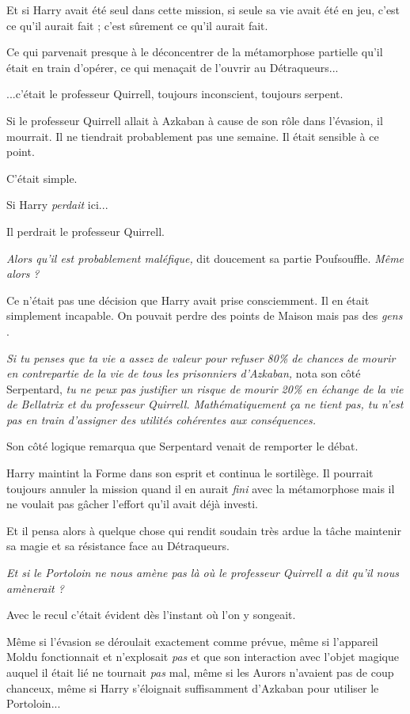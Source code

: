 Et si Harry avait été seul dans cette mission, si seule sa vie avait été en jeu, c'est ce qu'il aurait fait ; c'est sûrement ce qu'il aurait fait.

Ce qui parvenait presque à le déconcentrer de la métamorphose partielle qu'il était en train d'opérer, ce qui menaçait de l'ouvrir au Détraqueurs...

...c'était le professeur Quirrell, toujours inconscient, toujours serpent.

Si le professeur Quirrell allait à Azkaban à cause de son rôle dans l'évasion, il mourrait. Il ne tiendrait probablement pas une semaine. Il était sensible à ce point.

C'était simple.

Si Harry \emph{perdait } ici...

Il perdrait le professeur Quirrell.

\emph{Alors qu'il est probablement maléfique,}  dit doucement sa partie Poufsouffle. \emph{Même alors}  \emph{?} 

Ce n'était pas une décision que Harry avait prise consciemment. Il en était simplement incapable. On pouvait perdre des points de Maison mais pas des \emph{gens} .

\emph{Si tu penses que ta vie a assez de valeur pour refuser 80\% de chances de mourir en contrepartie de la vie de tous les prisonniers d'Azkaban, } nota son côté Serpentard, \emph{tu ne peux pas justifier un risque de mourir 20\% en échange de la vie de Bellatrix et du professeur Quirrell. Mathématiquement ça ne tient pas, tu n'est pas en train d'assigner des utilités cohérentes aux conséquences.} 

Son côté logique remarqua que Serpentard venait de remporter le débat.

Harry maintint la Forme dans son esprit et continua le sortilège. Il pourrait toujours annuler la mission quand il en aurait \emph{fini}  avec la métamorphose mais il ne voulait pas gâcher l'effort qu'il avait déjà investi.

Et il pensa alors à quelque chose qui rendit soudain très ardue la tâche maintenir sa magie et sa résistance face au Détraqueurs.

\emph{Et si le Portoloin ne nous amène pas là où le professeur Quirrell a dit qu'il nous amènerait ?} 

Avec le recul c'était évident dès l'instant où l'on y songeait.

Même si l'évasion se déroulait exactement comme prévue, même si l'appareil Moldu fonctionnait et n'explosait \emph{pas}  et que son interaction avec l'objet magique auquel il était lié ne tournait \emph{pas}  mal, même si les Aurors n'avaient pas de coup chanceux, même si Harry s'éloignait suffisamment d'Azkaban pour utiliser le Portoloin...

